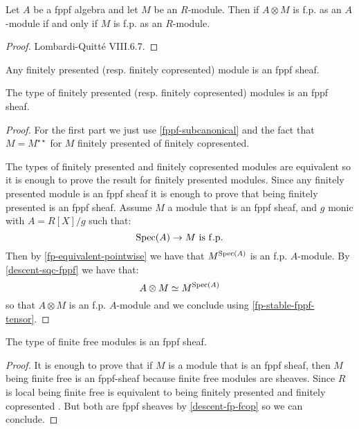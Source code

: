 \begin{lemma}\label{fp-stable-fppf-tensor}
Let $A$ be a fppf algebra and let $M$ be an $R$-module. Then if $A\otimes M$ is f.p. as an $A$-module if and only if $M$ is f.p. as an $R$-module.
\end{lemma}

\begin{proof}
Lombardi-Quitté VIII.6.7.
\end{proof}

\begin{lemma}\label{descent-fp-fcop}
Any finitely presented (resp. finitely copresented) module is an fppf sheaf.

The type of finitely presented (resp. finitely copresented) modules is an fppf sheaf.
\end{lemma}

\begin{proof}
For the first part we just use \cref{fppf-subcanonical} and the fact that $M=M^{\star\star}$ for $M$ finitely presented of finitely copresented.

The types of finitely presented and finitely copresented modules are equivalent so it is enough to prove the result for finitely presented modules. Since any finitely presented module is an fppf sheaf it is enough to prove that being finitely presented is an fppf sheaf. Assume $M$ a module that is an fppf sheaf, and $g$ monic with $A=R[X]/g$ such that:
\[\Spec(A)\to M\ \mathrm{is\ f.p.}\]
Then by \cref{fp-equivalent-pointwise} we have that $M^{\operatorname{Spec}(A)}$ is an f.p. $A$-module. By \cref{descent-sqc-fppf} we have that:
\[A\otimes M \simeq M^{\operatorname{Spec}(A)}\]
so that $A\otimes M$ is an f.p. $A$-module and we conclude using \cref{fp-stable-fppf-tensor}.
\end{proof}

\begin{proposition}\label{descent-finite-free}
The type of finite free modules is an fppf sheaf.
\end{proposition}

\begin{proof}
It is enough to prove that if $M$ is a module that is an fppf sheaf, then $M$ being finite free is an fppf-sheaf because finite free modules are sheaves. Since $R$ is local being finite free is equivalent to being finitely presented and finitely copresented \cite{TODO}. But both are fppf sheaves by \cref{descent-fp-fcop} so we can conclude.
\end{proof}

